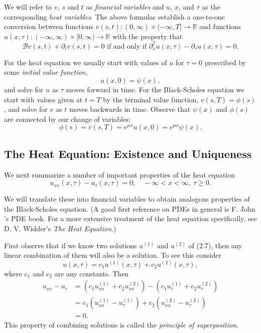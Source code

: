 We will refer to \(v\), \(s\) and \(t\) as \textit{financial variables} and \(u\), \(x\), and \(\tau\) as the corresponding \textit{heat variables}. The above formulas establish a one-to-one conversion between functions \(v(s,t): (0,\infty) \times (-\infty, T] \to \mathbb{R}\) and functions \(u(x,\tau): (-\infty,\infty) \times [0,\infty) \to \mathbb{R}\) with the property that
\[
\mathcal{B} v(s,t) + \partial_t v(s,t) = 0 \text{ if and only if } \partial_x^2 u(x,\tau) - \partial_{\tau} u(x,\tau) = 0.
\]

For the heat equation we usually start with values of \(u\) for \(\tau = 0\) prescribed by some \textit{initial value function},
\[
u(x,0) = \psi(x),
\]
and solve for \(u\) as \(\tau\) moves forward in time. For the Black-Scholes equation we start with values given at \(t = T\) by the terminal value function, \(v(s,T) = \phi(s)\), and solve for \(v\) as \(t\) moves backwards in time. Observe that \(\psi(x)\) and \(\phi(s)\) are connected by our change of variables:
\[
\phi(s) = v(s,T) = e^{\mu x} u(x,0) = e^{\mu x} \psi(x).
\]

\subsection{The Heat Equation: Existence and Uniqueness}

We next summarize a number of important properties of the heat equation
\[
u_{xx}(x,\tau) - u_{\tau}(x,\tau) = 0; \quad -\infty < x < \infty, \ \tau \geq 0.
\]

We will translate these into financial variables to obtain analogous properties of the Black-Scholes equation. (A good first reference on PDEs in general is F. John 's PDE book. For a more extensive treatment of the heat equation specifically, see D. V. Widder's \textit{The Heat Equation}.)

First observe that if we know two solutions \(u^{(1)}\) and \(u^{(2)}\) of (2.7), then any linear combination of them will also be a solution. To see this consider
\[
u(x,\tau) = c_1 u^{(1)}(x,\tau) + c_2 u^{(2)}(x,\tau),
\]
where \(c_1\) and \(c_2\) are any constants. Then
\begin{align*}
u_{xx} - u_{\tau} &= (c_1 u_{xx}^{(1)} + c_2 u_{xx}^{(2)}) - (c_1 u_{\tau}^{(1)} + c_2 u_{\tau}^{(2)}) \\
&= c_1 (u_{xx}^{(1)} - u_{\tau}^{(1)}) + c_2 (u_{xx}^{(2)} - u_{\tau}^{(2)}) \\
&= 0.
\end{align*}
This property of combining solutions is called the \textit{principle of superposition}.

